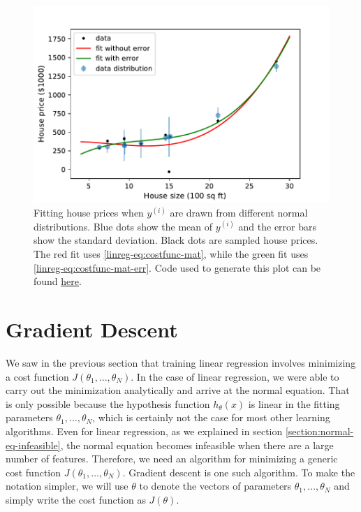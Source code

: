 \documentclass{article}
\theoremstyle{definition}
\begin{document}
\begin{figure}[ht]
\centering
\includegraphics[scale=0.7]{images/lin_reg/yerror.pdf}
\caption{Fitting house prices when $y^{(i)}$ are drawn from different normal distributions. Blue dots show the mean of $y^{(i)}$ and the error bars show the standard deviation. Black dots are sampled house prices. The red fit uses \eqref{linreg-eq:costfunc-mat}, while the green fit uses \eqref{linreg-eq:costfunc-mat-err}. Code used to generate this plot can be found \href{https://github.com/siavashaslanbeigi/ml_notes/blob/master/src/lin_reg/yerror.ipynb}{\color{blue} here}.}
\label{linreg-fig:yerror}
\end{figure}


\newpage
\section{Gradient Descent}
We saw in the previous section that training linear regression involves minimizing a cost function $J(\theta_1,\dots,\theta_N)$. In the case of linear regression, we were able to carry out the minimization analytically and arrive at the normal equation. That is only possible because the hypothesis function $h_{\theta}(x)$ is linear in the fitting parameters $\theta_1,\dots,\theta_N$, which is certainly not the case for most other learning algorithms.
Even for linear regression, as we explained in section \ref{section:normal-eq-infeasible}, the normal equation becomes infeasible when there are a large number of features. Therefore, we need an algorithm for minimizing a generic cost function $J(\theta_1,\dots,\theta_N)$. Gradient descent is one such algorithm. To make the notation simpler, we will use $\theta$ to denote the vectors of parameters $\theta_1,\dots,\theta_N$ and simply write the cost function as $J(\theta)$.
\end{document}

